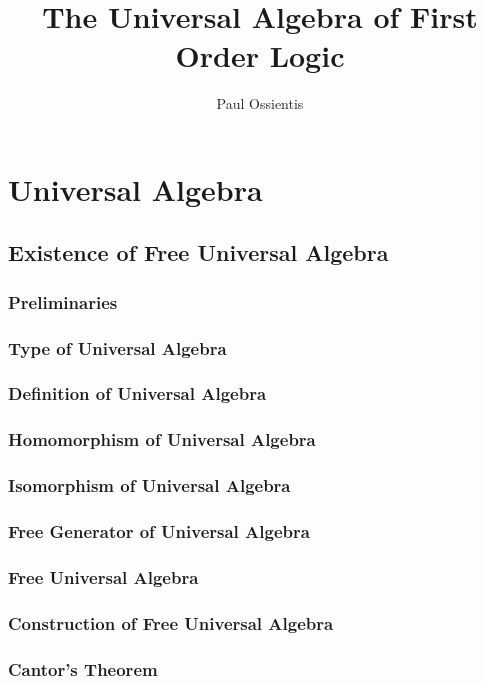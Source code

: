 \documentclass{report}
\title{The Universal Algebra of
  First Order Logic}
\author{Paul Ossientis}
\begin{document}
\maketitle
\tableofcontents
\newpage
\chapter{Universal Algebra}
\section{Existence of Free Universal Algebra}
    \subsection{Preliminaries}
      
    \subsection{Type of Universal Algebra}
      
    \subsection{Definition of Universal Algebra}
      
    \subsection{Homomorphism of Universal Algebra}
      
    \subsection{Isomorphism of Universal Algebra}
      
    \subsection{Free Generator of Universal Algebra}
      
    \subsection{Free Universal Algebra}
      
    \subsection{Construction of Free Universal Algebra}
      
    \subsection{Cantor's Theorem} 
      
\end{document}
